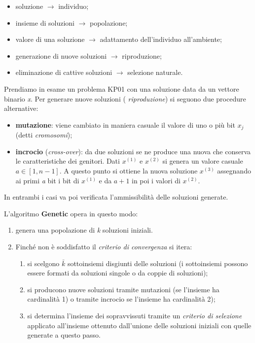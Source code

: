 \documentclass[11pt, oneside]{book}
\begin{document}
\begin{itemize}
\item soluzione $\rightarrow$ individuo;
\item insieme di soluzioni $\rightarrow$ popolazione;
\item valore di una soluzione $\rightarrow$ adattamento dell'individuo
  all'ambiente;
\item generazione di nuove soluzioni $\rightarrow$ riproduzione;
\item eliminazione di cattive soluzioni $\rightarrow$ selezione
  naturale.
\end{itemize}

\par\bigskip

Prendiamo in esame un problema KP01 con una soluzione data da un
vettore binario {\em x}. Per generare nuove soluzioni ({\em
  riproduzione}) si seguono due procedure alternative:

\begin{itemize}
\item {\bf mutazione}: viene cambiato in maniera casuale il valore di
  uno o pi\`u bit $x_j$ (detti {\em cromosomi});

\item {\bf incrocio} ({\em cross-over}): da due soluzioni se ne
  produce una nuova che conserva le caratteristiche dei genitori. Dati
  $x^{(1)}$ e $x^{(2)}$ si genera un valore casuale $a \in [1,
    n-1]$. A questo punto si ottiene la nuova soluzione $x^{(3)}$
  assegnando ai primi {\em a} bit i bit di $x^{(1)}$ e da $a+1$ in poi
  i valori di $x^{(2)}$.
\end{itemize}

In entrambi i casi va poi verificata l'ammissibilit\`a delle soluzioni
generate.

\par\bigskip

L'algoritmo {\bf Genetic} opera in questo modo:

\begin{enumerate}
\item genera una popolazione di {\em k} soluzioni iniziali. 
\item Finch\'e non \`e soddisfatto il {\em criterio di convergenza} si
  itera:

  \begin{enumerate}
  \item si scelgono $\bar{k}$ sottoinsiemi disgiunti delle
  soluzioni (i sottoinsiemi possono essere formati da soluzioni
  singole o da coppie di soluzioni);
  
  \item si producono nuove soluzioni tramite mutazioni (se l'insieme
    ha cardinalit\`a 1) o tramite incrocio se l'insieme ha
    cardinalit\`a 2);

  \item si determina l'insieme dei sopravvissuti tramite un {\em criterio
    di selezione} applicato all'insieme ottenuto dall'unione delle
    soluzioni iniziali con quelle generate a questo passo.

  \end{enumerate}

\end{enumerate}
\end{document}

